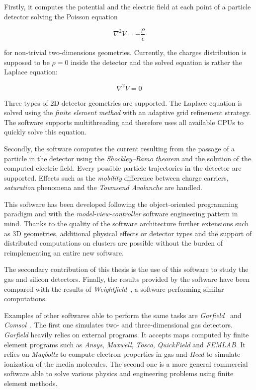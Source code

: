 \documentclass[11pt]{article}
\begin{document}
		Firstly, it computes the potential and the electric field
		at each point of a particle detector solving the Poisson equation

		\[\nabla^2 V = -\frac{\rho}{\epsilon}\]

		for non-trivial	two-dimensions geometries. Currently, the charges distribution
		is supposed to be $\rho=0$ inside the detector and the solved equation is
		rather the Laplace equation:

		\[\nabla^2 V = 0\]

		Three types of 2D detector geometries are supported.
		The Laplace equation is solved using the \textit{finite element method} with an adaptive
		grid refinement strategy. The software supports multithreading and therefore
		uses all available CPUs to quickly solve this equation.

		Secondly, the software computes the current resulting from the passage of a particle
		in the detector using the \textit{Shockley–Ramo theorem} and the solution of the
		computed electric field. Every possible particle trajectories in the detector
		are supported. Effects such as the \textit{mobility} difference between
		charge carriers, \textit{saturation} phenomena and the
		\textit{Townsend Avalanche} are handled.

		This software has been developed following the object-oriented
		programming paradigm and with the \textit{model-view-controller}
		software engineering pattern in mind. Thanks to the quality of the software
		architecture further extensions such as 3D geometries, additional physical effects or
		detector types and the support of distributed computations on clusters are possible
		without the burden of reimplementing an entire new software.

		The secondary contribution of this thesis is the use of this software to study
		the gas and silicon detectors. Finally, the results provided by the
		software have been compared with the results of \textit{Weightfield}~\cite{Cenna2015}, a
		software performing similar computations.

		Examples of other softwares able to perform the same tasks are
		\textit{Garfield}~\cite{garfield}	and \textit{Comsol}~\cite{comsol}.
		The first one simulates two- and three-dimensional gas detectors.
		\textit{Garfield} heavily relies on external programs.
		It accepts maps computed by finite element programs such as \textit{Ansys},
		\textit{Maxwell}, \textit{Tosca}, \textit{QuickField} and \textit{FEMLAB}.
		It relies on \textit{Magboltz} to compute electron properties in gas and
		\textit{Heed} to simulate ionization of the media molecules.
		The second one is a more general commercial software able to solve various physics and
		engineering problems using finite element methods.
\end{document}
